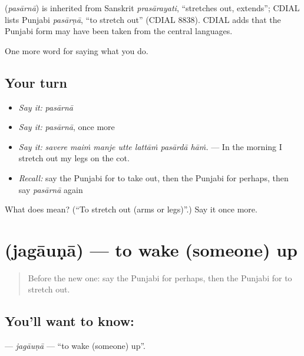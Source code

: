 \begin{cousinweb}
\textbf{} (\emph{pasārnā}) is inherited from Sanskrit \emph{prasārayati}, \textquotedblleft{}stretches out, extends\textquotedblright{}; CDIAL lists Punjabi \emph{pasārṇā}, \textquotedblleft{}to stretch out\textquotedblright{} (CDIAL 8838). CDIAL adds that the Punjabi form may have been taken from the central languages.
\end{cousinweb}

\begin{grammarlens}[title={What you've built}]
One more word for saying what you do.
\end{grammarlens}

\subsection*{Your turn}
\begin{itemize}
\raggedright
  \item \emph{Say it:} \emph{pasārnā}
  \item \emph{Say it:} \emph{pasārnā}, once more
  \item \emph{Say it:} \emph{savere maiṁ manje utte lattāṁ pasārdā hāṁ.} — In the morning I stretch out my legs on the cot.
  \item \emph{Recall:} say the Punjabi for to take out, then the Punjabi for perhaps, then say \emph{pasārnā} again
\end{itemize}

\begin{tcolorbox}[breakable,colback=teal!4,colframe=teal!35!black,title={Before you move on}]
What does  mean? (\textquotedblleft{}To stretch out (arms or legs)\textquotedblright{}.) Say it once more.
\end{tcolorbox}
\section[\texorpdfstring{\pa{ਜਗਾਉਣਾ} (jagāuṇā)}{ਜਗਾਉਣਾ (jagāuṇā)}]{ (jagāuṇā) — to wake (someone) up}

\label{lesson:PA-C225-jagauna}



\begin{quote}
Before the new one: say the Punjabi for perhaps, then the Punjabi for to stretch out.
\end{quote}

\subsection*{You'll want to know: }
\textbf{} — \emph{jagāuṇā} — \textquotedblleft{}to wake (someone) up\textquotedblright{}.

